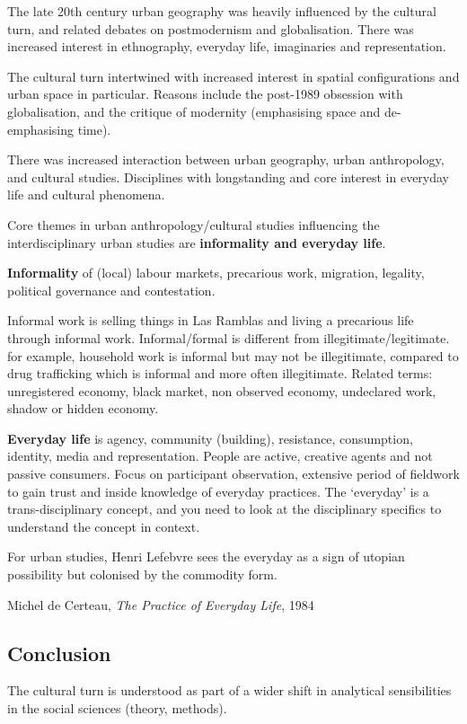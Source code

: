 \documentclass{article}
\begin{document}
The late 20th century urban geography was heavily influenced by the cultural turn, and related debates on postmodernism and globalisation. There was increased interest in ethnography, everyday life, imaginaries and representation.

The cultural turn intertwined with increased interest in spatial configurations and urban space in particular. Reasons include the post-1989 obsession with globalisation, and the critique of modernity (emphasising space and de-emphasising time).

There was increased interaction between urban geography, urban anthropology, and cultural studies. Disciplines with longstanding and core interest in everyday life and cultural phenomena.

Core themes in urban anthropology/cultural studies influencing the interdisciplinary urban studies are \textbf{informality and everyday life}.

\textbf{Informality} of (local) labour markets, precarious work, migration, legality, political governance and contestation. 

Informal work is selling things in Las Ramblas and living a precarious life through informal work. Informal/formal is different from illegitimate/legitimate. for example, household work is informal but may not be illegitimate, compared to drug trafficking which is informal and more often illegitimate. 
Related terms: unregistered economy, black market, non observed economy, undeclared work, shadow or hidden economy.

\textbf{Everyday life} is agency, community (building), resistance, consumption, identity, media and representation.
People are active, creative agents and not passive consumers. Focus on participant observation, extensive period of fieldwork to gain trust and inside knowledge of everyday practices.
The `everyday' is a trans-disciplinary concept, and you need to look at the disciplinary specifics to understand the concept in context. 

For urban studies, Henri Lefebvre sees the everyday as a sign of utopian possibility but colonised by the commodity form.

Michel de Certeau, \textit{The Practice of Everyday Life}, 1984

\subsection{Conclusion}

The cultural turn is understood as part of a wider shift in analytical sensibilities in the social sciences (theory, methods).
\end{document}
